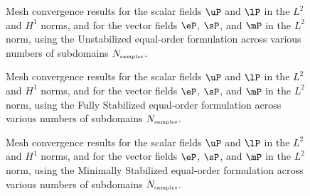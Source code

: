 \begin{figure}[h!]
	\centering
	\caption{Mesh convergence results for the scalar fields $\uP$ and $\lP$ in the $L^2$ and $H^1$ norms, and for the vector fields $\eP$, $\sP$, and $\mP$ in the $L^2$ norm, using the  Unstabilized equal-order formulation across various numbers of subdomains $N_{\mbox{\tiny samples}}$.}
	\def\svgwidth{1.0\columnwidth}
	
	\label{fig:quadricula_convergence_equal_order_unstabilized_linear}
\end{figure}

\begin{figure}[h!]
	\centering
	\caption{Mesh convergence results for the scalar fields $\uP$ and $\lP$ in the $L^2$ and $H^1$ norms, and for the vector fields $\eP$, $\sP$, and $\mP$ in the $L^2$ norm, using the Fully Stabilized equal-order formulation across various numbers of subdomains $N_{\mbox{\tiny samples}}$.}
	\def\svgwidth{1.0\columnwidth}
	
	\label{fig:quadricula_convergence_equal_order_fully_stabilized_linear}
\end{figure}


\begin{figure}[h!]
	\centering
	\caption{Mesh convergence results for the scalar fields $\uP$ and $\lP$ in the $L^2$ and $H^1$ norms, and for the vector fields $\eP$, $\sP$, and $\mP$ in the $L^2$ norm, using the Minimally Stabilized equal-order formulation across various numbers of subdomains $N_{\mbox{\tiny samples}}$.}
	\def\svgwidth{1.0\columnwidth}
	
	\label{fig:quadricula_convergence_equal_order_minimally_stabilized_linear}
\end{figure}



